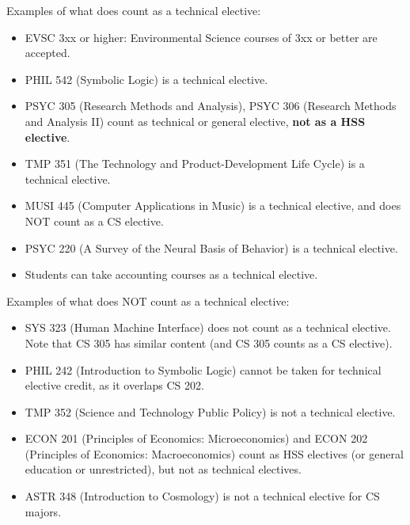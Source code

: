 \documentclass[12pt,twoside]{article}
\newenvironment{itemlist}{
\begin{itemize}
\setlength{\itemsep}{0pt}
\setlength{\parskip}{0pt}}
{\end{itemize}}
\begin{document}
\noindent Examples of what does count as a technical elective:
\begin{itemlist}
\item EVSC 3xx or higher: Environmental Science courses of 3xx or
better are accepted.
\item PHIL 542 (Symbolic Logic) is a technical elective.
\item PSYC 305 (Research Methods and Analysis), PSYC 306 (Research
  Methods and Analysis II) count as technical or general elective,
  {\bf not as a HSS elective}.
\item TMP 351 (The Technology and Product-Development Life Cycle) is a technical elective.
\item MUSI 445 (Computer Applications in Music) is a technical
elective, and does NOT count as a CS elective.
\item PSYC 220 (A Survey of the Neural Basis of Behavior) is a
technical elective.
\item Students can take accounting courses as a technical elective.  

\end{itemlist}

\noindent Examples of what does NOT count as a technical elective:
\begin{itemlist}
\item SYS 323 (Human Machine Interface) does not count as a technical
  elective.  Note that CS 305 has similar content (and CS 305 counts
  as a CS elective).
\item PHIL 242 (Introduction to Symbolic Logic) cannot be taken for
  technical elective credit, as it overlaps CS 202.
\item TMP 352 (Science and Technology Public Policy) is not a
  technical elective. %
\item ECON 201 (Principles of Economics: Microeconomics) and ECON 202
  (Principles of Economics: Macroeconomics) count as HSS  electives (or
  general education or unrestricted), but not as technical electives. 
\item ASTR 348 (Introduction to Cosmology) is not a technical elective
  for CS majors.
\end{itemlist}
\end{document}
